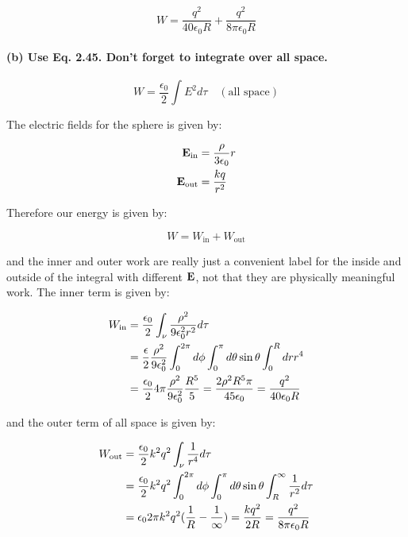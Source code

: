 \documentclass{article}
\numberwithin{equation}{section}
\numberwithin{figure}{section}
\begin{document}
\begin{equation}
    W = \frac{q^2}{40 \epsilon_0 R}+ \frac{q^2}{8 \pi \epsilon_0 R }
\end{equation}

\paragraph{(b) Use Eq. 2.45. Don’t forget to integrate over all space.}

\begin{equation*}
    W = \frac{\epsilon_0}{2} \int E^2 d \tau \quad  (\text{all space}) \tag{Eq. 2.45, Griffiths}  
\end{equation*}

The electric fields for the sphere is given by:

\begin{equation}
\begin{split}
       \vb E_\text{in} &= \frac{\rho}{3 \epsilon_0} r \\
    \vb E_\text{out} &= \frac{kq}{r^2}
\end{split}
\end{equation}

Therefore our energy is given by:

\begin{equation}
    W = W_\text{in} + W_\text{out}
\end{equation}

and the inner and outer work are really just a convenient label for the inside and outside of the integral with different $\vb E$, not that they are physically meaningful work. The inner term is given by:

\begin{equation}
\begin{split}
        W_\text{in} &= {\epsilon_0 \over 2} \int_\nu {\rho^2 \over 9 \epsilon_0^2 r^2} d\tau\\
        &= {\epsilon \over 2 } {\rho^2 \over 9 \epsilon_0^2} \int_0^{2\pi} d\phi \int_0^\pi d \theta \sin \theta \int_0^R dr r^4 \\
        &= \frac{\epsilon_0}{2}4 \pi \frac{\rho^2}{9 \epsilon^2_0} {R^5 \over 5} = \frac{2 \rho^2 R^5 \pi}{45 \epsilon_0} = \frac{q^2}{40 \epsilon_0 R}
\end{split}
\end{equation}

and the outer term of all space is given by:

\begin{equation}
\begin{split}
        W_\text{out} &= {\epsilon_0 \over 2} k^2 q^2 \int_\nu \frac{1}{r^4} d\tau \\
        &= {\epsilon_0 \over 2} k^2 q^2 \int_0^{2\pi} d\phi \int_0^\pi d\theta \sin \theta \int_R^\infty \frac{1}{r^2} d\tau \\
        &= \epsilon_0 2 \pi k^2 q^2 (\frac{1}{R} - \frac{1}{\infty}) = \frac{kq^2}{2R} = \frac{q^2}{8 \pi \epsilon_0 R}
\end{split}
\end{equation}
\end{document}
